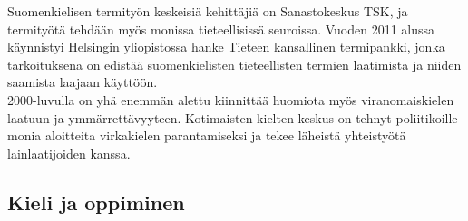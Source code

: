 \begin{multicols}{2}
Suomenkielisen termityön keskeisiä kehittäjiä on Sanastokeskus TSK, ja
termityötä tehdään myös monissa tieteellisissä seuroissa. Vuoden 2011 alussa
käynnistyi Helsingin yliopistossa hanke Tieteen kansallinen termipankki, jonka
tarkoituksena on edistää suomenkielisten tieteellisten termien laatimista ja
niiden saamista laajaan käyttöön.\\
2000-luvulla on yhä enemmän alettu kiinnittää huomiota myös viranomaiskielen
laatuun ja ymmärrettävyyteen. Kotimaisten kielten keskus on tehnyt
poliitikoille monia aloitteita virkakielen parantamiseksi ja tekee läheistä
yhteistyötä lainlaatijoiden kanssa.


\subsection{Kieli ja oppiminen}



\end{multicols}
